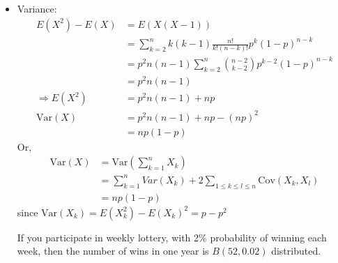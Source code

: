 \documentclass{article}
\newcommand{\Var}{\mathrm{Var}}
\newcommand{\Cov}{\mathrm{Cov}}
\begin{document}
\begin{itemize}
			\item Variance:
			\begin{align*}
				E(X^2)-E(X)&=E(X(X-1))\\
				&=\sum_{k=2}^{n}k(k-1)\frac{n!}{k!(n-k)!}p^k(1-p)^{n-k}\\
				&=p^2n(n-1)\sum_{k=2}^{n}\binom{n-2}{k-2}p^{k-2}(1-p)^{n-k}\\
				&=p^2n(n-1)\\
				\Rightarrow E(X^2)&=p^2n(n-1)+np\\
				\Var(X)&=p^2n(n-1)+np-(np)^2\\
				&=np(1-p)
			\end{align*}
			Or,
			\begin{align*}
				\Var(X)&=\Var(\sum_{k=1}^{n}X_k)\\
				&=\sum_{k=1}^{n}Var(X_k)+2\sum_{1\leq k\leq l\leq n}\Cov(X_k, X_l)\\
				&=np(1-p)
			\end{align*}
			since $\Var(X_k)=E(X_k^2)-E(X_k)^2=p-p^2$
			\begin{myrem*}{}{}
				If you participate in weekly lottery, with 2\% probability of winning each week, then the number of wins in one year is $B(52, 0.02)$ distributed.
			\end{myrem*}
		\end{itemize}
		
\end{document}
